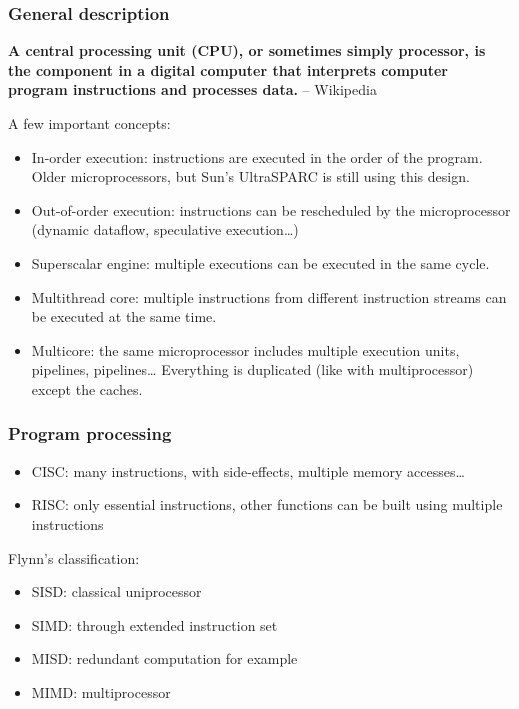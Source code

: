 \begin{frame}
  \frametitle{General description}

  \textbf{A central processing unit (CPU), or sometimes simply
  processor, is the component in a digital computer that interprets
  computer program instructions and processes data.} -- Wikipedia

  A few important concepts:

  \begin{itemize}
  \item
    In-order execution: instructions are executed in the order of the
    program. Older microprocessors, but Sun's UltraSPARC is still
    using this design.
  \item
    Out-of-order execution: instructions can be rescheduled by the
    microprocessor (dynamic dataflow, speculative execution\ldots)
  \item
    Superscalar engine: multiple executions can be executed in the same cycle.
  \item
    Multithread core: multiple instructions from different instruction
    streams can be executed at the same time.
  \item
    Multicore: the same microprocessor includes multiple execution
    units, pipelines, pipelines\ldots{} Everything is duplicated (like
    with multiprocessor) except the caches.
  \end{itemize}

\end{frame}


\begin{frame}
  \frametitle{Program processing}

  \begin{itemize}
  \item
    CISC: many instructions, with side-effects, multiple memory
    accesses\ldots
  \item
    RISC: only essential instructions, other functions can be built
    using multiple instructions
  \end{itemize}

  \-

  Flynn's classification:

  \begin{itemize}
  \item
    SISD: classical uniprocessor
  \item
    SIMD: through extended instruction set
  \item
    MISD: redundant computation for example
  \item
    MIMD: multiprocessor
  \end{itemize}

\end{frame}

